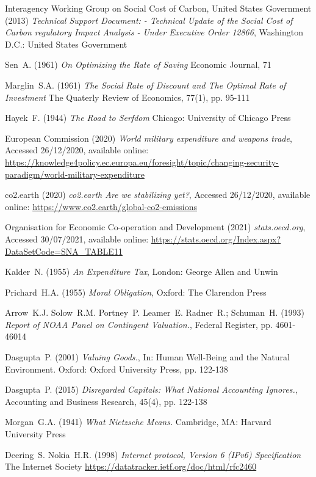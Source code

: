 \documentclass[11pt, oneside]{book}   	%
\begin{document}
\begin{thebibliography}{99}
 Interagency Working Group on Social Cost of Carbon, United States Government (2013)
\emph{Technical Support Document: - Technical Update of the Social Cost of Carbon regulatory Impact Analysis - Under Executive Order 12866},
Washington D.C.: United States Government
	
 Sen~A. (1961)
\emph{On Optimizing the Rate of Saving}
Economic Journal, 71
	
 Marglin~S.A. (1961)
\emph{The Social Rate of Discount and The Optimal Rate of Investment}
The Quaterly Review of Economics, 77(1), pp. 95-111
	
 Hayek~F. (1944)
\emph{The Road to Serfdom}
Chicago: University of Chicago Press
	
 European Commission (2020)
\emph{World military expenditure and weapons trade},
Accessed 26/12/2020, available online: 
\url{https://knowledge4policy.ec.europa.eu/foresight/topic/changing-security-paradigm/world-military-expenditure}
	
 co2.earth (2020)
\emph{co2.earth Are we stabilizing yet?},
Accessed 26/12/2020, available online: 
\url{https://www.co2.earth/global-co2-emissions}
	
 Organisation for Economic Co-operation and Development (2021)
\emph{stats.oecd.org},
Accessed 30/07/2021, available online: 
\url{https://stats.oecd.org/Index.aspx?DataSetCode=SNA_TABLE11}
	
 Kalder~N. (1955)
\emph{An Expenditure Tax},
London: George Allen and Unwin
	
 Prichard~H.A. (1955)
\emph{Moral Obligation},
Oxford: The Clarendon Press

 Arrow~K.J. Solow~R.M. Portney~P. Leamer~E. Radner~R.; Schuman~H. (1993)
\emph{Report of NOAA Panel on Contingent Valuation.},
Federal Register, pp. 4601-46014
	
 Dasgupta~P. (2001)
\emph{Valuing Goods.},
In: Human Well-Being and the Natural Environment. Oxford: Oxford University Press, pp. 122-138
	
 Dasgupta~P. (2015)
\emph{Disregarded Capitals: What National Accounting Ignores.},
Accounting and Business Research, 45(4), pp. 122-138
	
 Morgan~G.A. (1941)
\emph{What Nietzsche Means.}
Cambridge, MA: Harvard University Press

 Deering~S. Nokia~H.R. (1998)
\emph{Internet protocol, Version 6 (IPv6) Specification}
The Internet Society
\url{https://datatracker.ietf.org/doc/html/rfc2460}


\end{thebibliography}
\end{document}
